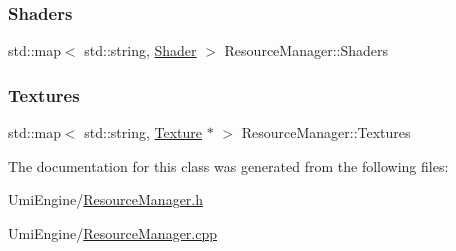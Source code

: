 \subsubsection{\texorpdfstring{Shaders}{Shaders}}
{\footnotesize\ttfamily std\+::map$<$ std\+::string, \mbox{\hyperlink{class_shader}{Shader}} $>$ Resource\+Manager\+::\+Shaders\hspace{0.3cm}{\ttfamily [static]}}

\mbox{\label{class_resource_manager_a43a756e8e9ce85e0cf25946205749a9f}} 
\subsubsection{\texorpdfstring{Textures}{Textures}}
{\footnotesize\ttfamily std\+::map$<$ std\+::string, \mbox{\hyperlink{class_texture}{Texture}} $\ast$ $>$ Resource\+Manager\+::\+Textures\hspace{0.3cm}{\ttfamily [static]}}



The documentation for this class was generated from the following files\+:\begin{DoxyCompactItemize}
\item 
Umi\+Engine/\mbox{\hyperlink{_resource_manager_8h}{Resource\+Manager.\+h}}\item 
Umi\+Engine/\mbox{\hyperlink{_resource_manager_8cpp}{Resource\+Manager.\+cpp}}\end{DoxyCompactItemize}
